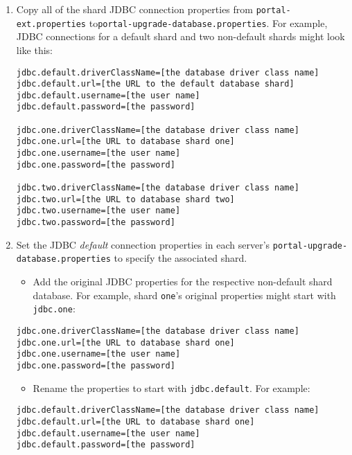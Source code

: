 \begin{enumerate}
\def\labelenumi{\arabic{enumi}.}
\item
  Copy all of the shard JDBC connection properties from
  \texttt{portal-ext.properties}
  to\texttt{portal-upgrade-database.properties}. For example, JDBC
  connections for a default shard and two non-default shards might look
  like this:

\begin{verbatim}
jdbc.default.driverClassName=[the database driver class name]
jdbc.default.url=[the URL to the default database shard]
jdbc.default.username=[the user name]
jdbc.default.password=[the password]

jdbc.one.driverClassName=[the database driver class name]
jdbc.one.url=[the URL to database shard one]
jdbc.one.username=[the user name]
jdbc.one.password=[the password]

jdbc.two.driverClassName=[the database driver class name]
jdbc.two.url=[the URL to database shard two]
jdbc.two.username=[the user name]
jdbc.two.password=[the password]
\end{verbatim}
\item
  Set the JDBC \emph{default} connection properties in each server's
  \texttt{portal-upgrade-database.properties} to specify the associated
  shard.

  \begin{itemize}
  \tightlist
  \item
    Add the original JDBC properties for the respective non-default
    shard database. For example, shard \texttt{one}'s original
    properties might start with \texttt{jdbc.one}:
  \end{itemize}

\begin{verbatim}
jdbc.one.driverClassName=[the database driver class name]
jdbc.one.url=[the URL to database shard one]
jdbc.one.username=[the user name]
jdbc.one.password=[the password]
\end{verbatim}

  \begin{itemize}
  \tightlist
  \item
    Rename the properties to start with \texttt{jdbc.default}. For
    example:
  \end{itemize}

\begin{verbatim}
jdbc.default.driverClassName=[the database driver class name]
jdbc.default.url=[the URL to database shard one]
jdbc.default.username=[the user name]
jdbc.default.password=[the password]
\end{verbatim}
\end{enumerate}

